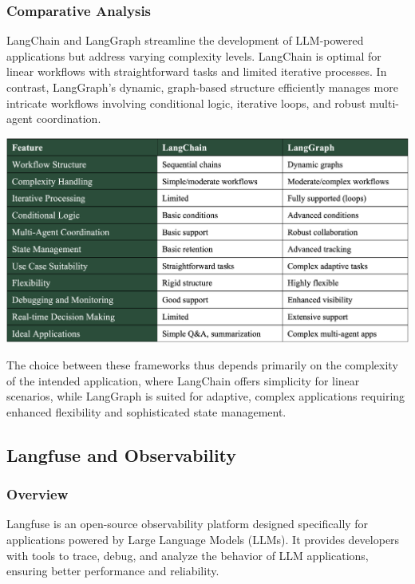 \subsubsection{Comparative Analysis}
LangChain and LangGraph streamline the development of LLM-powered applications but address varying complexity levels. LangChain is optimal for linear workflows with straightforward tasks and limited iterative processes. In contrast, LangGraph’s dynamic, graph-based structure efficiently manages more intricate workflows involving conditional logic, iterative loops, and robust multi-agent coordination.

\begin{center}
    \centering
    \includegraphics[width=1\textwidth]{Images/Comparison of LangChain and LangGraph.png}
    \label{tab:langchain_langgraph_comparison}
\end{center}

The choice between these frameworks thus depends primarily on the complexity of the intended application, where LangChain offers simplicity for linear scenarios, while LangGraph is suited for adaptive, complex applications requiring enhanced flexibility and sophisticated state management.

\subsection{Langfuse and Observability}

\subsubsection{Overview}
Langfuse is an open-source observability platform designed specifically for applications powered by Large Language Models (LLMs). It provides developers with tools to trace, debug, and analyze the behavior of LLM applications, ensuring better performance and reliability.\newpage

